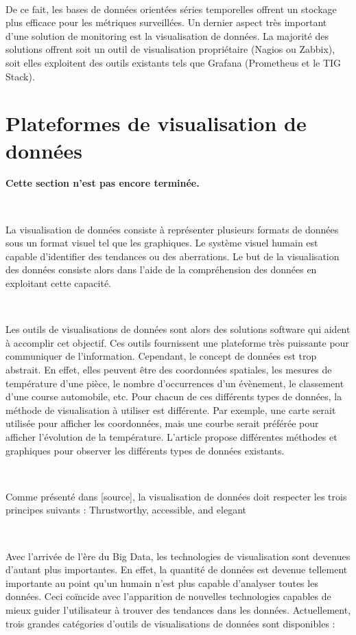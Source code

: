 ~

\noindent
De ce fait, les bases de données orientées séries temporelles offrent un stockage plus efficace pour les métriques surveillées. Un dernier aspect très important d’une solution de monitoring est la visualisation de données. La majorité des solutions offrent soit un outil de visualisation propriétaire (Nagios ou Zabbix), soit elles exploitent des outils existants tels que Grafana (Prometheus et le TIG Stack).


\section{Plateformes de visualisation de données}

\textbf{Cette section n'est pas encore terminée.}

~

La visualisation de données consiste à représenter plusieurs formats de données sous un format visuel tel que les graphiques. Le système visuel humain est capable d’identifier des tendances ou des aberrations. Le but de la visualisation des données consiste alors dans l’aide de la compréhension des données en exploitant cette capacité. \cite{zoo_data}

~

\noindent
Les outils de visualisations de données sont alors des solutions software qui aident à accomplir cet objectif. \cite{bikakis2018big} Ces outils fournissent une plateforme très puissante pour communiquer de l’information. Cependant, le concept de données est trop abstrait. En effet, elles peuvent être des coordonnées spatiales, les mesures de température d’une pièce, le nombre d’occurrences d’un évènement, le classement d’une course automobile, etc. Pour chacun de ces différents types de données, la méthode de visualisation à utiliser est différente. Par exemple, une carte serait utilisée pour afficher les coordonnées, mais une courbe serait préférée pour afficher l’évolution de la température. L’article \cite{zoo_data} propose différentes méthodes et graphiques pour observer les différents types de données existants.

~

\noindent
Comme présenté dans [source], la visualisation de données doit respecter les trois principes suivants :
Thrustworthy, accessible, and elegant

~

Avec l’arrivée de l’ère du Big Data, les technologies de visualisation sont devenues d’autant plus importantes. En effet, la quantité de données est devenue tellement importante au point qu’un humain n’est plus capable d’analyser toutes les données. Ceci coïncide avec l’apparition de nouvelles technologies capables de mieux guider l’utilisateur à trouver des tendances dans les données. Actuellement, trois grandes catégories d’outils de visualisations de données sont disponibles :

